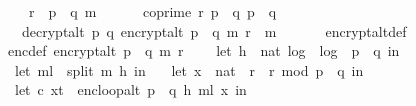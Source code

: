 \begin{isabellebody}
\ \ \ \ {\isachardoublequoteopen}r\ {\isacharless}{\kern0pt}\ p\ {\isacharasterisk}{\kern0pt}\ q{\isachardoublequoteclose}\ {\isachardoublequoteopen}m\ {\isasymnoteq}\ {\isacharbrackleft}{\kern0pt}{\isacharbrackright}{\kern0pt}{\isachardoublequoteclose}\isanewline
\ \ \ \ {\isachardoublequoteopen}coprime\ r\ {\isacharparenleft}{\kern0pt}p\ {\isacharasterisk}{\kern0pt}\ q{\isacharparenright}{\kern0pt}{\isachardoublequoteclose}\ {\isachardoublequoteopen}p\ {\isasymnoteq}\ q{\isachardoublequoteclose}\isanewline
\ \ \ {\isachardoublequoteopen}decrypt{\isacharunderscore}{\kern0pt}alt\ p\ q\ {\isacharparenleft}{\kern0pt}encrypt{\isacharunderscore}{\kern0pt}alt\ {\isacharparenleft}{\kern0pt}p\ {\isacharasterisk}{\kern0pt}\ q{\isacharparenright}{\kern0pt}\ m\ r{\isacharparenright}{\kern0pt}\ {\isacharequal}{\kern0pt}\ m{\isachardoublequoteclose}\isanewline
%
\isadelimproof
%
\endisadelimproof
%
\isatagproof
{}\isamarkupfalse%
\ {\isacharminus}{\kern0pt}\ \isanewline
\ \ \isamarkupfalse%
\ encrypt{\isacharunderscore}{\kern0pt}alt{\isacharunderscore}{\kern0pt}def\ \isamarkupfalse%
\ enc{\isacharunderscore}{\kern0pt}def{\isacharcolon}{\kern0pt}\ {\isachardoublequoteopen}encrypt{\isacharunderscore}{\kern0pt}alt\ {\isacharparenleft}{\kern0pt}p\ {\isacharasterisk}{\kern0pt}\ q{\isacharparenright}{\kern0pt}\ m\ r\ {\isacharequal}{\kern0pt}\ {\isacharparenleft}{\kern0pt}\isanewline
\ \ let\ h\ {\isacharequal}{\kern0pt}\ nat\ {\isasymlfloor}log\ {}\ {\isacharparenleft}{\kern0pt}log\ {}\ {\isacharparenleft}{\kern0pt}p\ {\isacharasterisk}{\kern0pt}\ q{\isacharparenright}{\kern0pt}{\isacharparenright}{\kern0pt}{\isasymrfloor}\ in\ \isanewline
\ \ let\ m{\isacharunderscore}{\kern0pt}l\ {\isacharequal}{\kern0pt}\ split\ m\ h\ in\ \isanewline
\ \ let\ {\isacharparenleft}{\kern0pt}x{\isacharunderscore}{\kern0pt}{}\ {\isacharcolon}{\kern0pt}{\isacharcolon}{\kern0pt}\ nat{\isacharparenright}{\kern0pt}\ {\isacharequal}{\kern0pt}\ {\isacharparenleft}{\kern0pt}r\ {\isacharasterisk}{\kern0pt}\ r{\isacharparenright}{\kern0pt}\ mod\ {\isacharparenleft}{\kern0pt}p\ {\isacharasterisk}{\kern0pt}\ q{\isacharparenright}{\kern0pt}\ in\ \isanewline
\ \ let\ {\isacharparenleft}{\kern0pt}c{\isacharcomma}{\kern0pt}\ x{\isacharunderscore}{\kern0pt}t{\isacharparenright}{\kern0pt}\ {\isacharequal}{\kern0pt}\ enc{\isacharunderscore}{\kern0pt}loop{\isacharunderscore}{\kern0pt}alt\ {\isacharparenleft}{\kern0pt}p\ {\isacharasterisk}{\kern0pt}\ q{\isacharcomma}{\kern0pt}\ h{\isacharcomma}{\kern0pt}\ m{\isacharunderscore}{\kern0pt}l{\isacharparenright}{\kern0pt}\ x{\isacharunderscore}{\kern0pt}{}\ in\ \isanewline

\end{isabellebody}
